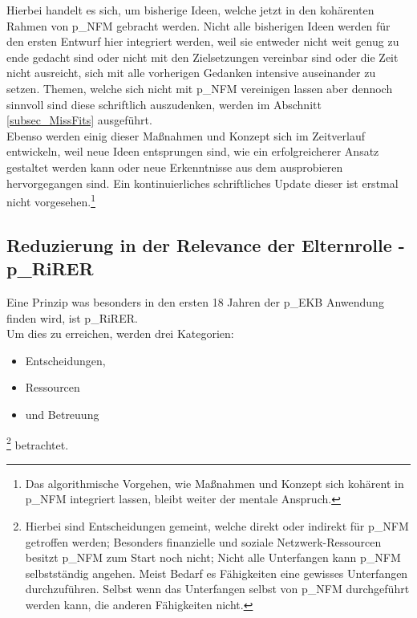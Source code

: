 Hierbei handelt es sich, um bisherige Ideen, welche jetzt in den kohärenten Rahmen von \gls{p_NFM} gebracht werden. Nicht alle bisherigen Ideen werden für den ersten Entwurf hier integriert werden, weil sie entweder nicht weit genug zu ende gedacht sind oder nicht mit den Zielsetzungen vereinbar sind oder die Zeit nicht ausreicht, sich mit alle vorherigen Gedanken intensive auseinander zu setzen. Themen, welche sich nicht mit \gls{p_NFM} vereinigen lassen aber dennoch sinnvoll sind diese schriftlich auszudenken, werden im Abschnitt \ref{subsec_MissFits} ausgeführt.\\




Ebenso werden einig dieser Maßnahmen und Konzept sich im Zeitverlauf entwickeln, weil neue Ideen entsprungen sind, wie ein erfolgreicherer Ansatz gestaltet werden kann oder neue Erkenntnisse aus dem ausprobieren hervorgegangen sind. Ein kontinuierliches schriftliches Update dieser ist erstmal nicht vorgesehen.\footnote{
	Das algorithmische Vorgehen, wie Maßnahmen und Konzept sich kohärent in \gls{p_NFM} integriert lassen, bleibt weiter der mentale Anspruch.
}

\subsection{Reduzierung in der Relevance der Elternrolle -\gls{p_RiRER}}

Eine Prinzip was besonders in den ersten 18 Jahren der \gls{p_EKB} Anwendung finden wird, ist  \gls{p_RiRER}.\\

Um dies zu erreichen, werden drei Kategorien: 
\begin{itemize}
	\item Entscheidungen,
	\item Ressourcen
	\item und Betreuung
\end{itemize}\footnote{
	Hierbei sind Entscheidungen gemeint, welche direkt oder indirekt für \gls{p_NFM} getroffen werden; Besonders finanzielle und soziale Netzwerk-Ressourcen besitzt \gls{p_NFM} zum Start noch nicht; Nicht alle Unterfangen kann \gls{p_NFM} selbstständig angehen. Meist Bedarf es Fähigkeiten eine gewisses Unterfangen durchzuführen. Selbst wenn das Unterfangen selbst von \gls{p_NFM} durchgeführt werden kann, die anderen Fähigkeiten nicht.
}
betrachtet.
